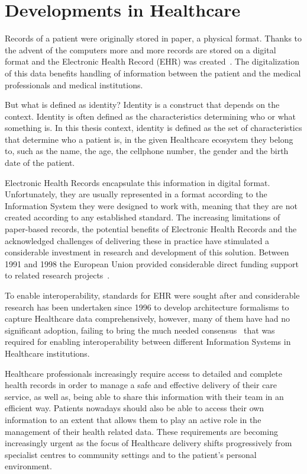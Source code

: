 \section{Developments in Healthcare} \label{blockchainHealthcare}

Records of a patient were originally stored in paper, a physical format.
Thanks to the advent of the computers more and more records are stored on a
digital format and the Electronic Health Record (EHR) was
created~\cite{Marquez2017}. The digitalization of this data benefits handling
of information between the patient and the medical professionals and medical
institutions\cite{ONCoordinator2017}.

But what is defined as identity? Identity is a construct that depends on the
context. Identity is often defined as the characteristics determining who or
what something is. In this thesis context, identity is defined as the set of
characteristics that determine who a patient is, in the given Healthcare
ecosystem they belong to, such as the name, the age, the cellphone number, the
gender and the birth date of the patient.  

Electronic Health Records encapsulate this information in digital format.
Unfortunately, they are usually represented in a format according to the
Information System they were designed to work with, meaning that they are not
created according to any established standard. The increasing limitations of
paper-based records, the potential benefits of Electronic Health Records and
the acknowledged challenges of delivering these in practice have stimulated a
considerable investment in research and development of this solution.  Between
1991 and 1998 the European Union provided considerable direct funding support
to related research projects~\cite{Kalra2006}.

To enable interoperability, standards for EHR were sought after and
considerable research has been undertaken since 1996 to develop architecture
formalisms to capture Healthcare data comprehensively, however, many of them
have had no significant adoption, failing to bring the much needed
consensus~\cite{Eichelberg2006} that was required for enabling interoperability
between different Information Systems in Healthcare institutions. 

Healthcare professionals increasingly require access to detailed and complete
health records in order to manage a safe and effective delivery of their care
service, as well as, being able to share this information with their team in an
efficient way. Patients nowadays should also be able to access their own
information to an extent that allows them to play an active role in the
management of their health related data. These requirements are becoming
increasingly urgent as the focus of Healthcare delivery shifts progressively
from specialist centres to community settings and to the patient’s personal
environment.

